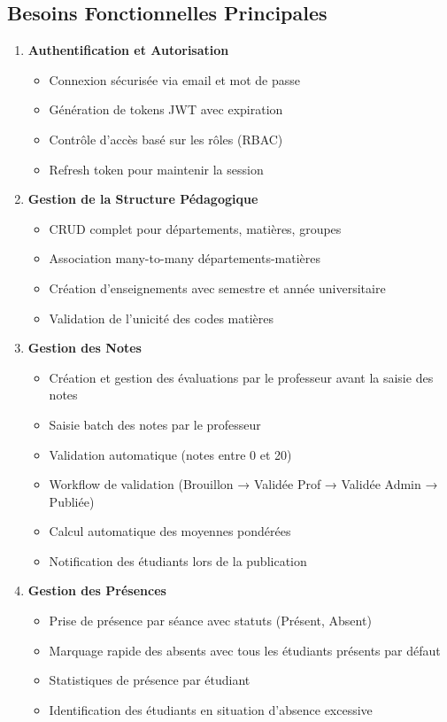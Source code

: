 \documentclass[12pt,a4paper]{report}
\begin{document}
\subsection{Besoins Fonctionnelles Principales}

\begin{enumerate}[itemsep=0.5em]
    \item \textbf{Authentification et Autorisation}
    \begin{itemize}
        \item Connexion sécurisée via email et mot de passe
        \item Génération de tokens JWT avec expiration
        \item Contrôle d'accès basé sur les rôles (RBAC)
        \item Refresh token pour maintenir la session
    \end{itemize}
    
    \item \textbf{Gestion de la Structure Pédagogique}
    \begin{itemize}
        \item CRUD complet pour départements, matières, groupes
        \item Association many-to-many départements-matières
        \item Création d'enseignements avec semestre et année universitaire
        \item Validation de l'unicité des codes matières
    \end{itemize}
    
    \item \textbf{Gestion des Notes}
    \begin{itemize}
        \item Création et gestion des évaluations par le professeur avant la saisie des notes
        \item Saisie batch des notes par le professeur
        \item Validation automatique (notes entre 0 et 20)
        \item Workflow de validation (Brouillon → Validée Prof → Validée Admin → Publiée)
        \item Calcul automatique des moyennes pondérées
        \item Notification des étudiants lors de la publication
    \end{itemize}
    
    \item \textbf{Gestion des Présences}
    \begin{itemize}
        \item Prise de présence par séance avec statuts (Présent, Absent)
        \item Marquage rapide des absents avec tous les étudiants présents par défaut
        \item Statistiques de présence par étudiant
        \item Identification des étudiants en situation d'absence excessive
    \end{itemize}
\end{enumerate}
\end{document}

